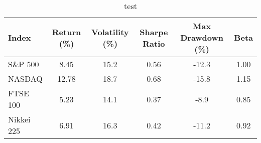 \begin{table}[htbp]
    \centering
    \caption{test}
    \label{tab:test}
    \begin{tabular}{lccccc}
    \toprule
    \textbf{Index} & \textbf{Return (\%)} & \textbf{Volatility (\%)} & \textbf{Sharpe Ratio} & \textbf{Max Drawdown (\%)} & \textbf{Beta} \\
    \midrule
    S\&P 500 & 8.45 & 15.2 & 0.56 & -12.3 & 1.00 \\
    NASDAQ & 12.78 & 18.7 & 0.68 & -15.8 & 1.15 \\
    FTSE 100 & 5.23 & 14.1 & 0.37 & -8.9 & 0.85 \\
    Nikkei 225 & 6.91 & 16.3 & 0.42 & -11.2 & 0.92 \\
    \bottomrule
    \end{tabular}
\end{table}